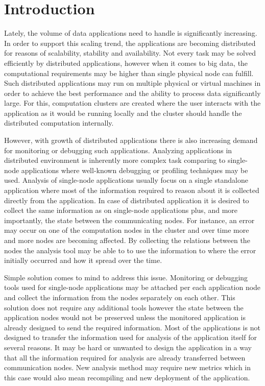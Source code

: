 \chapter{Introduction}
Lately, the volume of data applications need to handle is significantly increasing. In order to support this scaling trend, the applications are becoming distributed for reasons of scalability, stability and availability. Not every task may be solved efficiently by distributed applications, however when it comes to big data, the computational requirements may be higher than single physical node can fulfill.  Such distributed applications may run on multiple physical or virtual machines in order to achieve the best performance and the ability to process data significantly large. For this, computation clusters are created where the user interacts with the application as it would be running locally and the cluster should handle the distributed computation internally.

However, with growth of distributed applications there is also increasing demand for monitoring or debugging such applications. Analyzing applications in distributed environment is inherently more complex task comparing to single-node applications where well-known debugging or profiling techniques may be used. Analysis of single-node applications usually focus on a single standalone application where most of the information required to reason about it is collected directly from the application. In case of distributed application it is desired to collect the same information as on single-node applications plus, and more importantly, the state between the communicating nodes. For instance, an error may occur on one of the computation nodes in the cluster and over time more and more nodes are becoming affected. By collecting the relations between the nodes the analysis tool may be able to to use the information to where the error initially occurred and how it spread over the time. 

Simple solution comes to mind to address this issue. Monitoring or debugging tools used for single-node applications may be attached per each application node and collect the information from the nodes separately on each other. This solution does not require any additional tools however the state between the application nodes would not be preserved unless the monitored application is already designed to send the required information. Most of the applications is not designed to transfer the information used for analysis of the application itself for several reasons. It may be hard or unwanted to design the application in a way that all the information required for analysis are already transferred between communication nodes. New analysis method may require new metrics which in this case would also mean recompiling and new deployment of the application.

